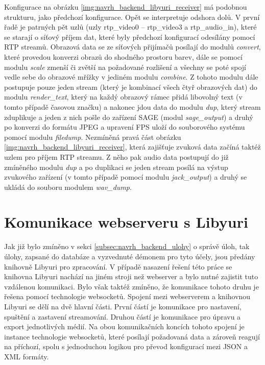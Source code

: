 \documentclass[thesis=M,czech]{FITthesis}[2012/06/26]
\begin{document}
Konfigurace na obrázku \ref{img:navrh_backend_libyuri_receiver} má podobnou strukturu, jako předchozí konfigurace. Opět se interpretuje odshora dolů. V první řadě je patrných pět uzlů (uzly rtp\_video0 -- rtp\_video3 a rtp\_audio\_in), které se starají o síťový příjem dat, které byly předchozí konfigurací odesílány pomocí RTP streamů. Obrazová data se ze síťových přijímačů posílají do modulů \textit{convert}, které provedou konverzi obrazů do shodného prostoru barev, dále se pomocí modulu \textit{scale} zmenší či zvětší na požadované rozlišení a všechny se poté spojí vedle sebe do obrazové mřížky v jediném modulu \textit{combine}. Z tohoto modulu dále postupuje pouze jeden stream (který je kombinací všech čtyř obrazových dat) do modulu \textit{render\_text}, který na každý obrazový rámec přidá libovolný text (v tomto případě časovou značku) a nakonec jdou data do modulu \textit{dup}, který stream zduplikuje a jeden z nich pošle do zařízení SAGE (modul \textit{sage\_output}) a druhý po konverzi do formátu JPEG a upravení FPS uloží do souborového systému pomocí modulu \textit{filedump}. Nezmíněná pravá část obrázku \ref{img:navrh_backend_libyuri_receiver}, která zajišťuje zvuková data začíná taktéž uzlem pro příjem RTP streamu. Z něho pak audio data postupují do již zmíněného modulu \textit{dup} a po duplikaci se jeden stream posílá na výstup zvukového zařízení (v tomto případě pomocí modulu \textit{jack\_output}) a druhý se ukládá do souboru modulem \textit{wav\_dump}.

\section{Komunikace webserveru s Libyuri} \label{sec:navrh_communication}
Jak již bylo zmíněno v sekci \ref{subsec:navrh_backend_ulohy} o správě úloh, tak úlohy, zapsané do databáze a vyzvednuté démonem pro tyto účely, jsou předány knihovně Libyuri pro zpracování. V případě nasazení řešení této práce se knihovna Libyuri nachází na jiném stroji než webserver a bylo nutné zajistit tuto vzdálenou komunikaci. Bylo však taktéž zmíněno, že komunikace tohoto druhu je řešena pomocí technologie websocketů. Spojení mezi webserverem a knihovnou Libyuri se dělí na dvě hlavní části. První částí je komunikace pro nastavení, spuštění a zastavení streamování. Druhou částí je komunikace pro úpravu a export jednotlivých médií. Na obou komunikačních koncích tohoto spojení je instance technologie websocketů, které posílají požadovaná data a zároveň reagují na příchozí, spolu s jednoduchou logikou pro převod konfigurací mezi JSON a XML formáty. 
\end{document}
